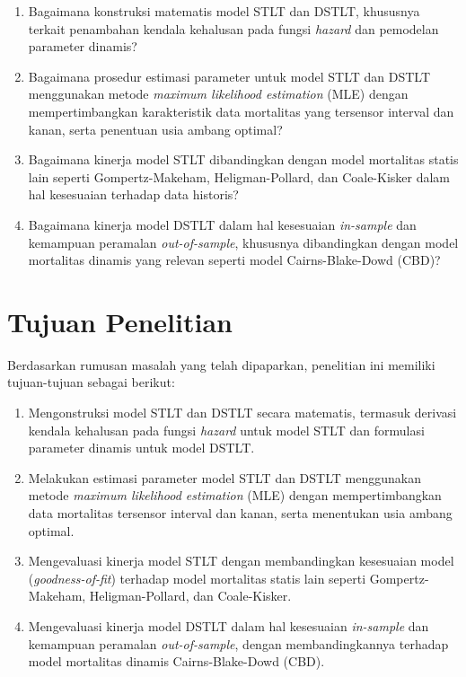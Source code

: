 \begin{enumerate}
    \item Bagaimana konstruksi matematis model STLT dan DSTLT, khususnya terkait penambahan kendala kehalusan pada fungsi \textit{hazard} dan pemodelan parameter dinamis?
    
    \item Bagaimana prosedur estimasi parameter untuk model STLT dan DSTLT menggunakan metode \textit{maximum likelihood estimation} (MLE) dengan mempertimbangkan karakteristik data mortalitas yang tersensor interval dan kanan, serta penentuan usia ambang optimal?
    
    \item Bagaimana kinerja model STLT dibandingkan dengan model mortalitas statis lain seperti Gompertz-Makeham, Heligman-Pollard, dan Coale-Kisker dalam hal kesesuaian terhadap data historis?
    
    \item Bagaimana kinerja model DSTLT dalam hal kesesuaian \textit{in-sample} dan kemampuan peramalan \textit{out-of-sample}, khususnya dibandingkan dengan model mortalitas dinamis yang relevan seperti model Cairns-Blake-Dowd (CBD)?
\end{enumerate}

\section{Tujuan Penelitian}

Berdasarkan rumusan masalah yang telah dipaparkan, penelitian ini memiliki tujuan-tujuan sebagai berikut:

\begin{enumerate}
    \item Mengonstruksi model STLT dan DSTLT secara matematis, termasuk derivasi kendala kehalusan pada fungsi \textit{hazard} untuk model STLT dan formulasi parameter dinamis untuk model DSTLT.
    
    \item Melakukan estimasi parameter model STLT dan DSTLT menggunakan metode \textit{maximum likelihood estimation} (MLE) dengan mempertimbangkan data mortalitas tersensor interval dan kanan, serta menentukan usia ambang optimal.
    
    \item Mengevaluasi kinerja model STLT dengan membandingkan kesesuaian model (\textit{goodness-of-fit}) terhadap model mortalitas statis lain seperti Gompertz-Makeham, Heligman-Pollard, dan Coale-Kisker.
    
    \item Mengevaluasi kinerja model DSTLT dalam hal kesesuaian \textit{in-sample} dan kemampuan peramalan \textit{out-of-sample}, dengan membandingkannya terhadap model mortalitas dinamis Cairns-Blake-Dowd (CBD).
\end{enumerate}

